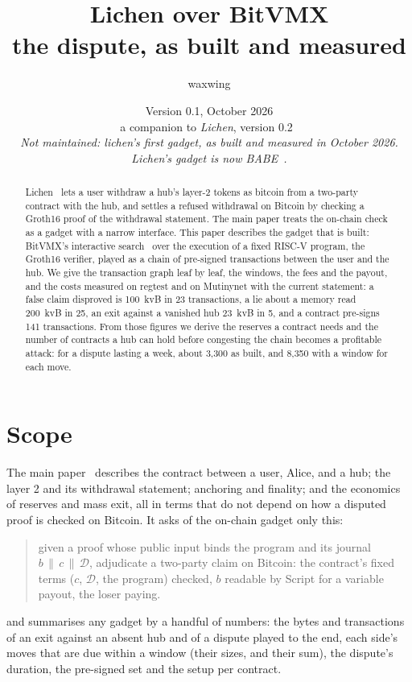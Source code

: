 \documentclass[11pt]{article}
\title{\textbf{Lichen over BitVMX}\\the dispute, as built and measured}
\author{waxwing}
\date{Version 0.1, October 2026\\[2pt]\small a companion to \emph{Lichen}, version 0.2~\cite{lichen}\\[4pt]\small\emph{Not maintained: lichen's first gadget, as built and measured in October 2026.}\\\small\emph{Lichen's gadget is now BABE~\cite{lichenbuilt}.}}
\begin{document}
\maketitle

\begin{abstract}
Lichen~\cite{lichen} lets a user withdraw a hub's layer-2 tokens as
bitcoin from a two-party contract with the hub, and settles a refused
withdrawal on Bitcoin by checking a Groth16 proof of the withdrawal
statement. The main paper treats the on-chain check as a gadget with a
narrow interface. This paper describes the gadget that is built: BitVMX's
interactive search~\cite{bitvmx} over the execution of a fixed RISC-V
program, the Groth16 verifier, played as a chain of pre-signed
transactions between the user and the hub. We give the transaction graph
leaf by leaf, the windows, the fees and the payout, and the costs
measured on regtest and on Mutinynet with the current statement: a false
claim disproved is 100~kvB in 23 transactions, a lie about a memory read
200~kvB in 25, an exit against a vanished hub 23~kvB in 5, and a
contract pre-signs 141 transactions. From those figures we derive the
reserves a contract needs and the number of contracts a hub can hold
before congesting the chain becomes a profitable attack: for a dispute
lasting a week, about 3,300 as built, and 8,350 with a window for each
move.
\end{abstract}

\tableofcontents

\section{Scope}
\label{sec:scope}

The main paper~\cite{lichen} describes the contract between a user,
Alice, and a hub; the layer 2 and its withdrawal statement; anchoring and
finality; and the economics of reserves and mass exit, all in terms that
do not depend on how a disputed proof is checked on Bitcoin. It asks of
the on-chain gadget only this:
\begin{quote}
given a proof whose public input binds the program and its journal
$b \,\|\, c \,\|\, \mathcal{D}$, adjudicate a two-party claim on Bitcoin: the
contract's fixed terms ($c$, $\mathcal{D}$, the program) checked, $b$ readable by
Script for a variable payout, the loser paying.
\end{quote}
and summarises any gadget by a handful of numbers: the bytes and
transactions of an exit against an absent hub and of a dispute played
to the end, each side's moves that are due within a window (their sizes,
and their sum), the dispute's duration, the pre-signed set and the setup
per contract.
\end{document}

